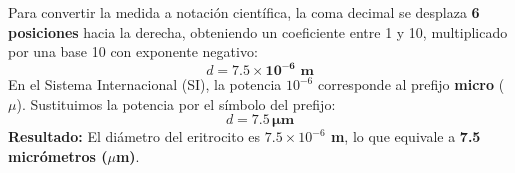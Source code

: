 \documentclass[12pt]{article}
\begin{document}
\begin{tcolorbox}
    \vspace{0.4cm}
    \begin{tcolorbox}[colback=medteal!10, colframe=medteal, arc=2mm, boxrule=1.2pt, title=\textbf{Desarrollo Matemático y Solución}]
        Para convertir la medida a notación científica, la coma decimal se desplaza \textbf{6 posiciones} hacia la derecha, obteniendo un coeficiente entre 1 y 10, multiplicado por una base 10 con exponente negativo:
        \[ d = \mathbf{7.5 \times 10^{-6} \text{ m}} \]
        En el Sistema Internacional (SI), la potencia $10^{-6}$ corresponde al prefijo \textbf{micro} ($\mu$). Sustituimos la potencia por el símbolo del prefijo:
        \[ d = \mathbf{7.5 \, \mu\text{m}} \]
        \textbf{Resultado:} El diámetro del eritrocito es \textbf{$7.5 \times 10^{-6}$ m}, lo que equivale a \textbf{7.5 micrómetros ($\mu$m)}.
    \end{tcolorbox}
    
\end{tcolorbox}
\end{document}
